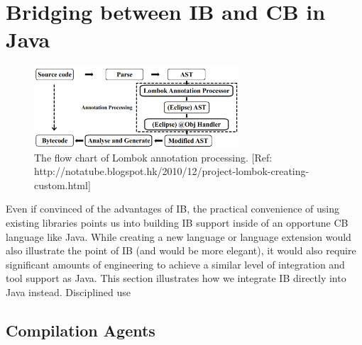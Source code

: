 \section{Bridging between IB and CB in Java}

\begin{figure}[t]\label{fig:lombok}
\centering
\includegraphics[width=3in]{pdfs/lombok2.png}
\caption{The flow chart of Lombok annotation processing. [Ref: http://notatube.blogspot.hk/2010/12/project-lombok-creating-custom.html]
}
\end{figure}


Even if convinced of the advantages of IB, the practical convenience
of using existing libraries points us into building IB support inside
of an opportune CB language like Java.
While creating a new language or language extension would also
illustrate the point of IB (and would be more elegant), it would also
require significant amounts of engineering to achieve a similar level
of integration and tool support as Java.
This section illustrates how we integrate IB directly into Java instead. 
Disciplined use  

\subsection{Compilation Agents}

